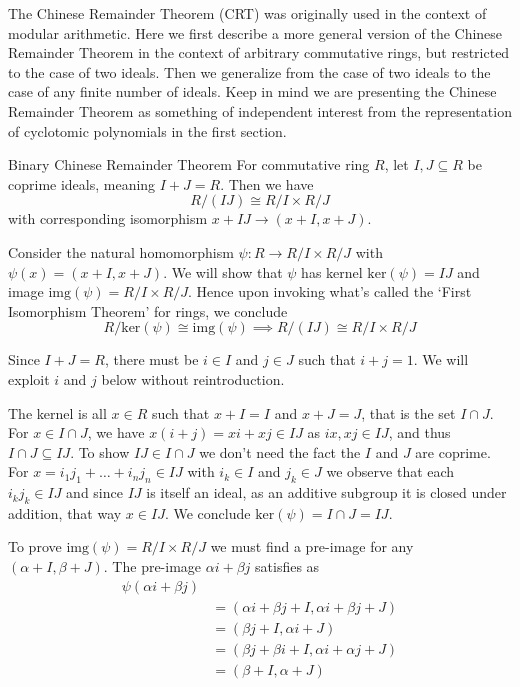 The Chinese Remainder Theorem (CRT) was originally used in the context of modular arithmetic.
Here we first describe a more general version of the Chinese Remainder Theorem in the context of arbitrary commutative rings, but restricted to the case of two ideals.
Then we generalize from the case of two ideals to the case of any finite number of ideals.
Keep in mind we are presenting the Chinese Remainder Theorem as something of independent interest from the representation of cyclotomic polynomials in the first section.

\begin{lemma}{Binary Chinese Remainder Theorem}
    For commutative ring $R$, let $I,J\subseteq R$ be coprime ideals, meaning $I+J = R$.
    Then we have
    \begin{equation}
        R/(IJ)\cong R/I\times R/J
    \end{equation}
    with corresponding isomorphism $x+IJ\to(x+I,x+J)$.
    
    \proof
    Consider the natural homomorphism $\psi\colon R\to R/I\times R/J$ with $\psi(x)=(x+I,x+J)$.
    We will show that $\psi$ has kernel $\text{ker}(\psi)=IJ$ and image $\text{img}(\psi)=R/I\times R/J$.
    Hence upon invoking what's called the `First Isomorphism Theorem' for rings, we conclude
    \begin{equation}
        R/\text{ker}(\psi)\cong\text{img}(\psi)
        \implies
        R/(IJ)\cong R/I\times R/J
    \end{equation}

    Since $I+J=R$, there must be $i\in I$ and $j\in J$ such that $i+j=1$.
    We will exploit $i$ and $j$ below without reintroduction.

    The kernel is all $x\in R$ such that $x+I=I$ and $x+J=J$, that is the set $I\cap J$.
    For $x\in I\cap J$, we have $x(i+j)=xi+xj\in IJ$ as $ix,xj\in IJ$, and thus $I\cap J\subseteq IJ$.
    To show $IJ\in I\cap J$ we don't need the fact the $I$ and $J$ are coprime.
    For $x=i_1j_1+\dots+i_nj_n\in IJ$ with $i_k\in I$ and $j_k\in J$ we observe that each $i_kj_k\in IJ$ and since $IJ$ is itself an ideal, as an additive subgroup it is closed under addition, that way $x\in IJ$.
    We conclude $\text{ker}(\psi)=I\cap J=IJ$.

    To prove $\text{img}(\psi)=R/I\times R/J$ we must find a pre-image for any $(\alpha+I,\beta+J)$.
    The pre-image $\alpha i+\beta j$ satisfies as
    \begin{align}
        \psi(\alpha i+\beta j) \\
        &= (\alpha i+\beta j+I,\alpha i+\beta j+J) \\
        &= (\beta j+I,\alpha i+J) \\
        &= (\beta j+\beta i+I,\alpha i+\alpha j+J) \\
        &= (\beta+I,\alpha+J)
    \end{align}


\end{lemma}
